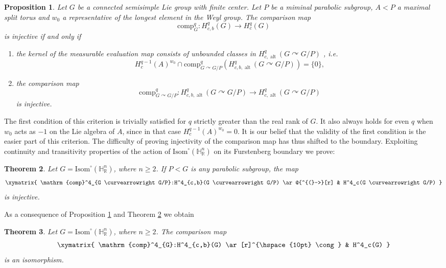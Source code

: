 \documentclass[a4paper]{amsart}
\newtheorem{intro_thm}{Theorem}
\newtheorem{intro_prop}[intro_thm]{Proposition}
\theoremstyle{definition}
\theoremstyle{remark}
\theoremstyle{TheoremNum}
\DeclareMathOperator{\alt}{\mathrm{alt}}
\begin{document}
\begin{intro_prop}\label{prop injectivity comparison}\label{criterion}
Let $G$ be a connected semisimple Lie group with finite center. Let $P$ be a miminal parabolic subgroup, $A<P$ a maximal split torus and $w_0$ a representative of the longest element in the Weyl group. The comparison map 
$$
\mathrm{comp}^q_G:H^q_{c,b}(G) \rightarrow H^q_c(G)
$$
is injective if and only if 
\begin{enumerate}
\item the kernel of the measurable evaluation map consists of unbounded classes in $H^q_{c,\alt}(G \curvearrowright G/P)$ , i.e. 
$$H^{q-1}_c(A)^{w_0}\cap \mathrm{comp}^q_{G \curvearrowright G/P}(H^q_{c,b,\alt}(G \curvearrowright G/P))=\{0\},$$ 

\item the comparison map 
$$
\mathrm{comp}^q_{G \curvearrowright G/P}: H^q_{c,b,\alt}(G \curvearrowright G/P) \longrightarrow H^q_{c,\alt}(G \curvearrowright G/P)
$$
is injective.
\end{enumerate}

\end{intro_prop} 


The first condition of this criterion is trivially satisfied for $q$ strictly greater than the real rank of $G$. It also always holds for even $q$ when $w_0$ acts as $-1$ on the Lie algebra of $A$, since in that case $H^{q-1}_c(A)^{w_0}=0$. It is our belief that the validity of the first condition is the easier part of this criterion. The difficulty of proving injectivity of the comparison map has thus shifted to the boundary. Exploiting continuity and transitivity properties of the action of $\mathrm{Isom}^\circ(\mathbb{H}^n_{\mathbb{R}})$ on its Furstenberg boundary we prove: 

\begin{intro_thm}\label{thm boundary deg 4}
Let $G=\mathrm{Isom}^\circ(\mathbb{H}^n_{\mathbb{R}})$, where $n \geq 2$. If $P<G$ is any parabolic subgroup, the map
$$
\xymatrix{
\mathrm{comp}^4_{G \curvearrowright G/P}:H^4_{c,b}(G \curvearrowright G/P) \ar@{^{(}->}[r] & H^4_c(G \curvearrowright G/P)
}
$$
is injective. 
\end{intro_thm}

As a consequence of Proposition \ref{prop injectivity comparison} and Theorem \ref{thm boundary deg 4} we obtain 

\begin{intro_thm}\label{thm group deg 4}\label{thm real}
Let $G=\mathrm{Isom}^\circ(\mathbb{H}^n_{\mathbb{R}})$, where $n \geq 2$. The comparison map 
$$
\xymatrix{
\mathrm{comp}^4_{G}:H^4_{c,b}(G) \ar[r]^{\hspace{10pt} \cong} & H^4_c(G)
}
$$
is an isomorphism. 
\end{intro_thm}
\end{document}
